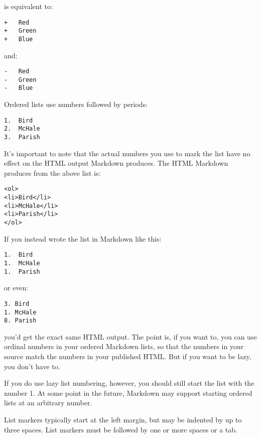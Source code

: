 is equivalent to:

\begin{lstlisting}
+   Red
+   Green
+   Blue
\end{lstlisting}




and:

\begin{lstlisting}
-   Red
-   Green
-   Blue
\end{lstlisting}




Ordered lists use numbers followed by periods:

\begin{lstlisting}
1.  Bird
2.  McHale
3.  Parish
\end{lstlisting}




It's important to note that the actual numbers you use to mark the
list have no effect on the HTML output Markdown produces. The HTML
Markdown produces from the above list is:

\begin{lstlisting}
<ol>
<li>Bird</li>
<li>McHale</li>
<li>Parish</li>
</ol>
\end{lstlisting}




If you instead wrote the list in Markdown like this:

\begin{lstlisting}
1.  Bird
1.  McHale
1.  Parish
\end{lstlisting}




or even:

\begin{lstlisting}
3. Bird
1. McHale
8. Parish
\end{lstlisting}




you'd get the exact same HTML output. The point is, if you want to,
you can use ordinal numbers in your ordered Markdown lists, so that
the numbers in your source match the numbers in your published HTML.
But if you want to be lazy, you don't have to.



If you do use lazy list numbering, however, you should still start the
list with the number 1. At some point in the future, Markdown may support
starting ordered lists at an arbitrary number.



List markers typically start at the left margin, but may be indented by
up to three spaces. List markers must be followed by one or more spaces
or a tab.



